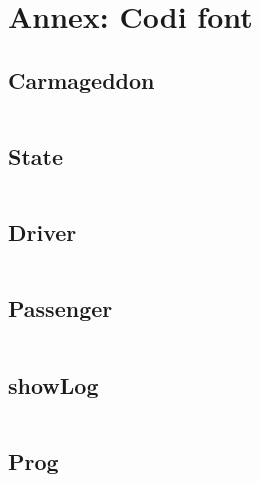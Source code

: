 \section{Annex: Codi font}

\subsection{Carmageddon}
\inputminted[linenos, frame=lines, fontsize=\codeSize]{python}{../aima/carmageddon.py}
\newpage

\subsection{State}
\inputminted[linenos, frame=lines, fontsize=\codeSize]{python}{../aima/state.py}
\newpage

\subsection{Driver}
\inputminted[linenos, frame=lines, fontsize=\codeSize]{python}{../aima/driver.py}
\newpage

\subsection{Passenger}
\inputminted[linenos, frame=lines, fontsize=\codeSize]{python}{../aima/passenger.py}
\newpage


\subsection{showLog}
\inputminted[linenos, frame=lines, fontsize=\codeSize]{python}{../aima/showLog.py}


\subsection{Prog}
\inputminted[linenos, frame=lines, fontsize=\codeSize]{python}{../aima/prog.py}

